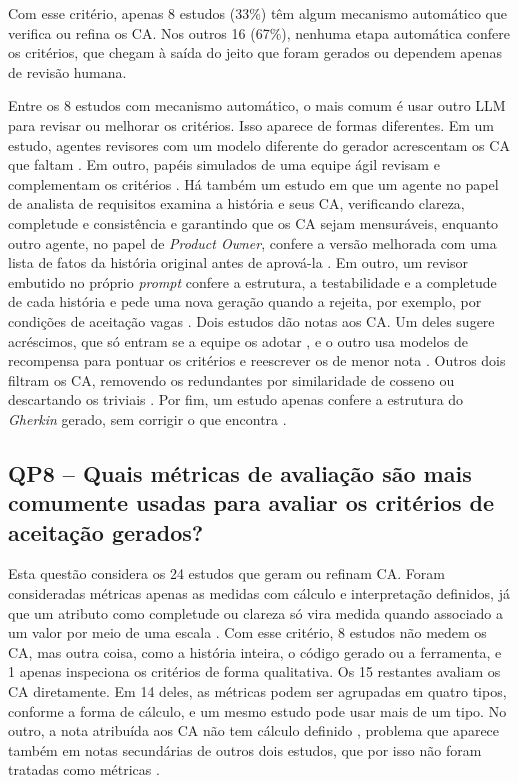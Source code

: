 Com esse critério, apenas 8 estudos (33\%) têm algum mecanismo automático que verifica ou refina os CA. Nos outros 16 (67\%), nenhuma etapa automática confere os critérios, que chegam à saída do jeito que foram gerados ou dependem apenas de revisão humana.

Entre os 8 estudos com mecanismo automático, o mais comum é usar outro LLM para revisar ou melhorar os critérios. Isso aparece de formas diferentes. Em um estudo, agentes revisores com um modelo diferente do gerador acrescentam os CA que faltam \cite{rotar2025}. Em outro, papéis simulados de uma equipe ágil revisam e complementam os critérios \cite{li2024}. Há também um estudo em que um agente no papel de analista de requisitos examina a história e seus CA, verificando clareza, completude e consistência e garantindo que os CA sejam mensuráveis, enquanto outro agente, no papel de \textit{Product Owner}, confere a versão melhorada com uma lista de fatos da história original antes de aprová-la \cite{zhang2024}. Em outro, um revisor embutido no próprio \textit{prompt} confere a estrutura, a testabilidade e a completude de cada história e pede uma nova geração quando a rejeita, por exemplo, por condições de aceitação vagas \cite{weerakoon2026}. Dois estudos dão notas aos CA. Um deles sugere acréscimos, que só entram se a equipe os adotar \cite{baker2026}, e o outro usa modelos de recompensa para pontuar os critérios e reescrever os de menor nota \cite{wang2025}. Outros dois filtram os CA, removendo os redundantes por similaridade de cosseno \cite{li2024} ou descartando os triviais \cite{schwedt2025}. Por fim, um estudo apenas confere a estrutura do \textit{Gherkin} gerado, sem corrigir o que encontra \cite{huang2026}.

\subsection{QP8 -- Quais métricas de avaliação são mais comumente usadas para avaliar os critérios de aceitação gerados?}
\label{sec:qp8}

Esta questão considera os 24 estudos que geram ou refinam CA. Foram consideradas métricas apenas as medidas com cálculo e interpretação definidos, já que um atributo como completude ou clareza só vira medida quando associado a um valor por meio de uma escala \cite{wohlin2000}. Com esse critério, 8 estudos não medem os CA, mas outra coisa, como a história inteira, o código gerado ou a ferramenta, e 1 apenas inspeciona os critérios de forma qualitativa. Os 15 restantes avaliam os CA diretamente. Em 14 deles, as métricas podem ser agrupadas em quatro tipos, conforme a forma de cálculo, e um mesmo estudo pode usar mais de um tipo. No outro, a nota atribuída aos CA não tem cálculo definido \cite{rotar2025}, problema que aparece também em notas secundárias de outros dois estudos, que por isso não foram tratadas como métricas \cite{ferreira2025,matveeva2025}.

